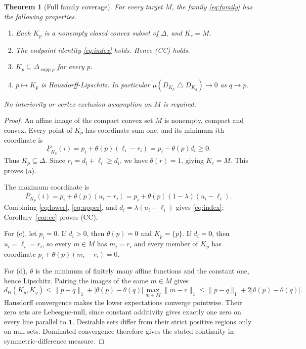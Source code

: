\documentclass[11pt]{article}
\newtheorem{theorem}{Theorem}
\theoremstyle{remark}
\newcommand{\one}{\mathbf 1}
\newcommand{\supp}{\operatorname{supp}}
\newcommand{\sd}{\mathbin{\triangle}}
\newcommand{\dH}{d_{\mathrm H}}
\newcommand{\lo}{\underline P}
\newcommand{\hi}{\overline P}
\begin{document}
\begin{theorem}[Full family coverage]\label{thm:family}
For every target $M$, the family \eqref{eq:family} has the following properties.
\begin{enumerate}[label=(\alph*)]
\item Each $K_p$ is a nonempty closed convex subset of $\Delta$, and $K_r=M$.
\item The endpoint identity \eqref{eq:index} holds. Hence (CC) holds.
\item $K_p\subseteq\Delta_{\supp p}$ for every $p$.
\item $p\mapsto K_p$ is Hausdorff-Lipschitz. In particular
$\mu(D_{K_p}\sd D_{K_q})\to0$ as $q\to p$.
\end{enumerate}
No interiority or vertex exclusion assumption on $M$ is required.
\end{theorem}
\begin{proof}
An affine image of the compact convex set $M$ is nonempty, compact and convex.
Every point of $K_p$ has coordinate sum one, and its minimum $i$th coordinate is
\[
 \lo_{K_p}(i)=p_i+\theta(p)(\ell_i-r_i)
             =p_i-\theta(p)d_i\ge0.
 \tag{5}\label{eq:lower}
\]
Thus $K_p\subseteq\Delta$. Since $r_i=d_i+\ell_i\ge d_i$, we have
$\theta(r)=1$, giving $K_r=M$. This proves (a).

The maximum coordinate is
\[
 \hi_{K_p}(i)=p_i+\theta(p)(u_i-r_i)
             =p_i+\theta(p)(1-\lambda)(u_i-\ell_i).
 \tag{6}\label{eq:upper}
\]
Combining \eqref{eq:lower}, \eqref{eq:upper}, and
$d_i=\lambda(u_i-\ell_i)$ gives \eqref{eq:index}; Corollary~\ref{cor:cc}
proves (CC).

For (c), let $p_i=0$. If $d_i>0$, then $\theta(p)=0$ and $K_p=\{p\}$.
If $d_i=0$, then $u_i=\ell_i=r_i$, so every $m\in M$ has $m_i=r_i$ and
every member of $K_p$ has coordinate $p_i+\theta(p)(m_i-r_i)=0$.

For (d), $\theta$ is the minimum of finitely many affine functions and the
constant one, hence Lipschitz. Pairing the images of the same $m\in M$ gives
\[
 \dH(K_p,K_q)
 \le\|p-q\|_1+|\theta(p)-\theta(q)|\max_{m\in M}\|m-r\|_1
 \le\|p-q\|_1+2|\theta(p)-\theta(q)|.
\]
Hausdorff convergence makes the lower expectations converge pointwise. Their
zero sets are Lebesgue-null, since constant additivity gives exactly one zero
on every line parallel to $\one$. Desirable sets differ from their strict
positive regions only on null sets. Dominated convergence therefore gives the
stated continuity in symmetric-difference measure.
\end{proof}
\end{document}
